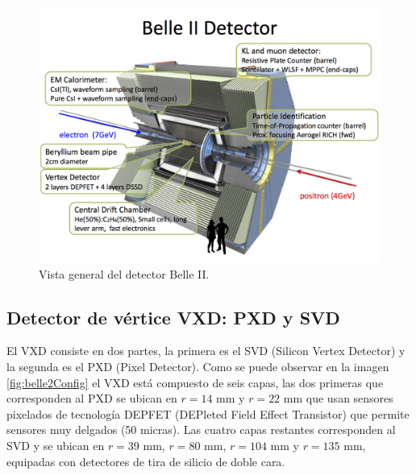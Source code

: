  \begin{figure}[h]
    \centering
    \includegraphics[scale=.5]{Images/belle2.png}
    \caption{\small Vista general del detector Belle II.}
    \label{fig:belle2}
\end{figure}

\newpage
\subsection{Detector de vértice VXD: PXD y SVD}

El VXD consiste en dos partes, la primera es el SVD (Silicon Vertex Detector) y la segunda es el PXD (Pixel Detector). Como se puede observar en la imagen \ref{fig:belle2Config} el VXD está compuesto de seis capas, las dos primeras que corresponden al PXD se ubican en \(r = 14\) mm y \(r = 22\) mm que usan sensores pixelados de tecnología DEPFET (DEPleted Field Effect Transistor) que permite sensores muy delgados (50 micras). Las cuatro capas restantes corresponden al SVD y se ubican en \(r = 39\) mm, \(r = 80 \) mm, \(r = 104\)  mm y \(r = 135\) mm, equipadas con detectores de tira de silicio de doble cara.

